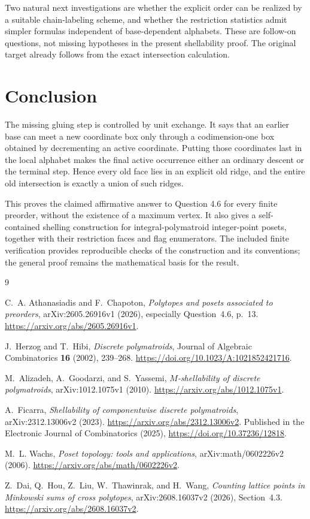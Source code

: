 \documentclass[11pt]{article}
\numberwithin{equation}{section}
\theoremstyle{definition}
\theoremstyle{remark}
\begin{document}
Two natural next investigations are whether the explicit order can be
realized by a suitable chain-labeling scheme, and whether the restriction
statistics admit simpler formulas independent of base-dependent alphabets.
These are follow-on questions, not missing hypotheses in the present
shellability proof. The original target already follows from the exact
intersection calculation.

\section{Conclusion}

The missing gluing step is controlled by unit exchange. It says that an
earlier base can meet a new coordinate box only through a codimension-one
box obtained by decrementing an active coordinate. Putting those coordinates
last in the local alphabet makes the final active occurrence either an
ordinary descent or the terminal step. Hence every old face lies in an
explicit old ridge, and the entire old intersection is exactly a union of
such ridges.

This proves the claimed affirmative answer to Question 4.6 for every finite
preorder, without the existence of a maximum vertex. It also gives a
self-contained shelling construction for integral-polymatroid integer-point
posets, together with their restriction faces and flag enumerators. The
included finite verification provides reproducible checks of the construction
and its conventions; the general proof remains the mathematical basis for
the result.

\begin{thebibliography}{9}

C.~A. Athanasiadis and F.~Chapoton,
\emph{Polytopes and posets associated to preorders},
arXiv:2605.26916v1 (2026), especially Question~4.6, p.~13.
\url{https://arxiv.org/abs/2605.26916v1}.

J.~Herzog and T.~Hibi,
\emph{Discrete polymatroids},
Journal of Algebraic Combinatorics \textbf{16} (2002), 239--268.
\url{https://doi.org/10.1023/A:1021852421716}.

M.~Alizadeh, A.~Goodarzi, and S.~Yassemi,
\emph{$M$-shellability of discrete polymatroids},
arXiv:1012.1075v1 (2010).
\url{https://arxiv.org/abs/1012.1075v1}.

A.~Ficarra,
\emph{Shellability of componentwise discrete polymatroids},
arXiv:2312.13006v2 (2023).
\url{https://arxiv.org/abs/2312.13006v2}.
Published in the Electronic Journal of Combinatorics (2025),
\url{https://doi.org/10.37236/12818}.

M.~L. Wachs,
\emph{Poset topology: tools and applications},
arXiv:math/0602226v2 (2006).
\url{https://arxiv.org/abs/math/0602226v2}.

Z.~Dai, Q.~Hou, Z.~Liu, W.~Thawinrak, and H.~Wang,
\emph{Counting lattice points in Minkowski sums of cross polytopes},
arXiv:2608.16037v2 (2026), Section~4.3.
\url{https://arxiv.org/abs/2608.16037v2}.

\end{thebibliography}
\end{document}
